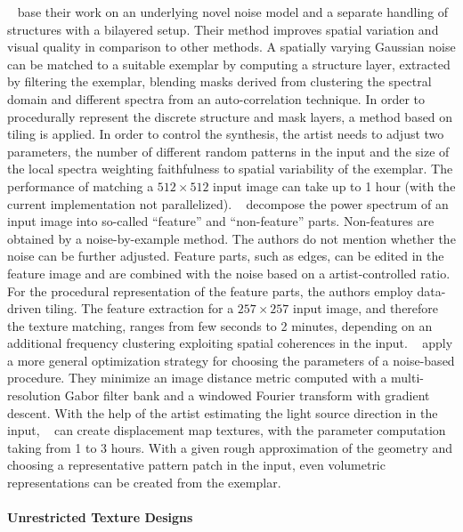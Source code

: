  \citeauthor*{guingo_2017_btm}~\cite{guingo_2017_btm} base their work on an underlying novel noise model and a separate handling of structures with a bilayered setup. Their method improves spatial variation and visual quality in comparison to other methods. A spatially varying Gaussian noise can be matched to a suitable exemplar by computing a structure layer, extracted by filtering the exemplar, blending masks derived from clustering the spectral domain and different spectra from an auto-correlation technique. In order to procedurally represent the discrete structure and mask layers, a method based on tiling is applied. In order to control the synthesis, the artist needs to adjust two parameters, the number of different random patterns in the input and the size of the local spectra weighting faithfulness to spatial variability of the exemplar. The performance of matching a $512\times512$ input image can take up to 1 hour (with the current implementation not parallelized).
 \citeauthor*{kang_2017_fpt}~\cite{kang_2017_fpt} decompose the power spectrum of an input image into so-called “feature” and “non-feature” parts. Non-features are obtained by a noise-by-example method. The authors do not mention whether the noise can be further adjusted. Feature parts, such as edges, can be edited in the feature image and are combined with the noise based on a artist-controlled ratio. For the procedural representation of the feature parts, the authors employ data-driven tiling. The feature extraction for a $257\times257$ input image, and therefore the texture matching, ranges from few seconds to 2 minutes, depending on an additional frequency clustering exploiting spatial coherences in the input.
 \citeauthor*{gilet_2010_ias}~\cite{gilet_2010_ias} apply a more general optimization strategy for choosing the parameters of a noise-based procedure. They minimize an image distance metric computed with a multi-resolution Gabor filter bank and a windowed Fourier transform with gradient descent. With the help of the artist estimating the light source direction in the input, \citeauthor*{gilet_2010_ias}~\cite{gilet_2010_ias} can create displacement map textures, with the parameter computation taking from 1 to 3 hours. With a given rough approximation of the geometry and choosing a representative pattern patch in the input, even volumetric representations can be created from the exemplar.



\paragraph{Unrestricted Texture Designs}
\label{para:analysis_example_based_unristricted}

